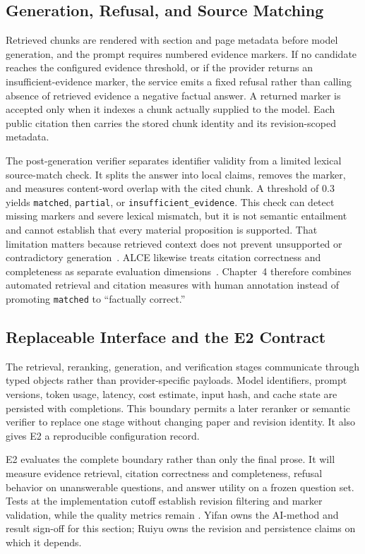 \subsection{Generation, Refusal, and Source Matching}

Retrieved chunks are rendered with section and page metadata before model generation, and the prompt requires numbered evidence markers. If no candidate reaches the configured evidence threshold, or if the provider returns an insufficient-evidence marker, the service emits a fixed refusal rather than calling absence of retrieved evidence a negative factual answer. A returned marker is accepted only when it indexes a chunk actually supplied to the model. Each public citation then carries the stored chunk identity and its revision-scoped metadata.

The post-generation verifier separates identifier validity from a limited lexical source-match check. It splits the answer into local claims, removes the marker, and measures content-word overlap with the cited chunk. A threshold of 0.3 yields \texttt{matched}, \texttt{partial}, or \texttt{insufficient\_evidence}. This check can detect missing markers and severe lexical mismatch, but it is not semantic entailment and cannot establish that every material proposition is supported. That limitation matters because retrieved context does not prevent unsupported or contradictory generation~\cite{niu2024ragtruth}. ALCE likewise treats citation correctness and completeness as separate evaluation dimensions~\cite{gao2023alce}. Chapter~4 therefore combines automated retrieval and citation measures with human annotation instead of promoting \texttt{matched} to ``factually correct.''

\subsection{Replaceable Interface and the E2 Contract}

The retrieval, reranking, generation, and verification stages communicate through typed objects rather than provider-specific payloads. Model identifiers, prompt versions, token usage, latency, cost estimate, input hash, and cache state are persisted with completions. This boundary permits a later reranker or semantic verifier to replace one stage without changing paper and revision identity. It also gives E2 a reproducible configuration record.

E2 evaluates the complete boundary rather than only the final prose. It will measure evidence retrieval, citation correctness and completeness, refusal behavior on unanswerable questions, and answer utility on a frozen question set. Tests at the implementation cutoff establish revision filtering and marker validation, while the quality metrics remain \pending{}. Yifan owns the AI-method and result sign-off for this section; Ruiyu owns the revision and persistence claims on which it depends.

